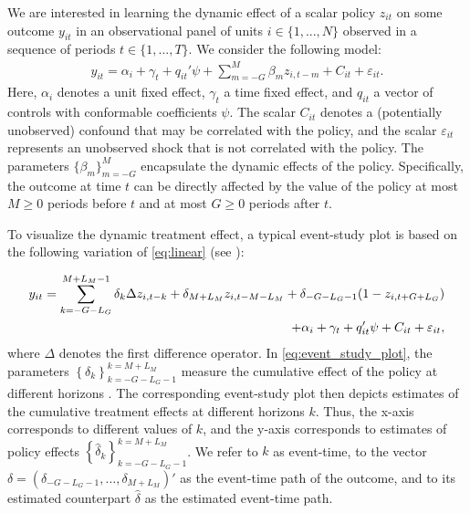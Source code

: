 \documentclass[bib]{./sty/statapress}
\begin{document}
We are interested in learning the dynamic effect of a scalar policy $z_{it}$ on some outcome $y_{it}$ in an observational panel of units $i\in\{1,...,N\}$ observed in a sequence of periods $t\in\{1,...,T\}$. We consider the following model:
\begin{align}
y_{it} =  \alpha_{i} + \gamma_{t} + q_{it}'\psi  + \sum_{m=-G}^{M}\beta_m z_{i,t-m} + C_{it} + \varepsilon_{it}. \label{eq:linear}
\end{align}
Here, $\alpha_i$ denotes a unit fixed effect, $\gamma_t$ a time fixed effect, and $q_{it}$ a vector of controls with conformable coefficients $\psi$.
The scalar $C_{it}$ denotes a (potentially unobserved) confound that may be correlated with the policy, and the scalar $\varepsilon_{it}$ represents an unobserved shock that is not correlated with the policy.
The parameters $\{\beta_{m}\}_{m=-G}^{M}$ encapsulate the dynamic effects of the policy.
Specifically, the outcome at time $t$ can be directly affected by the value of the policy at most $M \ge 0$ periods before $t$ and at most $G \geq 0 $ periods after $t$.


To visualize the dynamic treatment effect, a typical event-study plot is based on the following variation of \eqref{eq:linear} (see \citeauthor{freyaldenhoven2021visualization} \citeyear{freyaldenhoven2021visualization}):

\begin{equation}
\label{eq:event_study_plot}
    \begin{split}
        y_{it} = \sum_{k=-G-L_G}^{M+L_M -1}\delta_k \Delta  z_{i,t-k} + \delta_{M+L_M} z_{i,t-M-L_M} + \delta_{-G-L_G-1}(1-z_{i,t+G+L_G})
        \\ \centering
        + \alpha_{i} + \gamma_{t} + q'_{it}\psi + C_{it} + \varepsilon_{it},
    \end{split}
\end{equation}
where $\Delta$ denotes the first difference operator.
In \eqref{eq:event_study_plot}, the parameters $\left\{ \delta_k \right\}_{k = - G - L_G - 1}^{k = M + L_M}$ measure the cumulative effect of the policy at different horizons \citep{schmidheiny2019event}.
The corresponding event-study plot then depicts estimates of the cumulative treatment effects at different horizons $k$.
Thus, the x-axis corresponds to different values of $k$, and the y-axis corresponds to estimates of policy effects $\left\{ \hat{\delta}_k \right\}_{k = - G - L_G - 1}^{k = M + L_M}$.
We refer to $k$ as event-time, to the vector $\delta = (\delta_{-G - L_G -1}, \ldots, \delta_{M + L_M})'$ as the event-time path of the outcome, and to its estimated counterpart $\hat{\delta}$ as the estimated event-time path.
\end{document}
